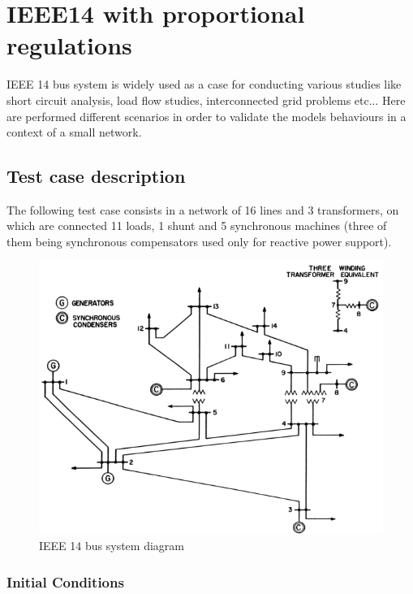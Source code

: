 \documentclass[a4paper, 12pt]{report}
\begin{document}
\chapter*{IEEE14 with proportional regulations}


IEEE 14 bus system is widely used as a case for conducting various studies like short circuit analysis, load flow studies, interconnected grid problems etc...
Here are performed different scenarios in order to validate the models behaviours in a context of a small network.

\section{Test case description}

The following test case consists in a network of 16 lines and 3 transformers, on which are connected 11 loads, 1 shunt and 5 synchronous machines (three of them being synchronous compensators used only for reactive power support).

\begin{figure}[H]
  \includegraphics[width=\textwidth]{Single-line-diagram-of-IEEE-14-bus-system.png}
  \caption{IEEE 14 bus system diagram}
\end{figure}

\subsection{Initial Conditions}
\end{document}
